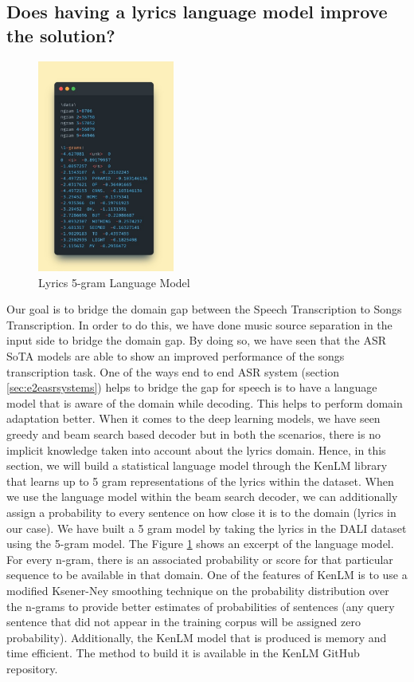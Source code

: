     
\subsection{Does having a lyrics language model improve the solution?}



\begin{figure}
    \centering
    \includegraphics[width=0.4\textwidth]{05-research study/figures/lyricslanguagemodel.pdf}
    \caption{Lyrics 5-gram Language Model}
    \label{fig:lyricslanguagemodel}
\end{figure}


Our goal is to bridge the domain gap between the Speech Transcription to Songs Transcription. In order to do this, we have done music source separation in the input side to bridge the domain gap. By doing so, we have seen that the ASR SoTA models are able to show an improved performance of the songs transcription task. One of the ways end to end ASR system (section \ref{sec:e2easrsystems}) helps to bridge the gap for speech is to have a language model that is aware of the domain while decoding. This helps to perform domain adaptation better. When it comes to the deep learning models, we have seen greedy and beam search based decoder but in both the scenarios, there is no implicit knowledge taken into account about the lyrics domain. Hence, in this section, we will build a statistical language model through the KenLM library \cite{heafield-etal-2013-scalable} that learns up to 5 gram representations of the lyrics within the dataset. When we use the language model within the beam search decoder, we can additionally assign a probability to every sentence on how close it is to the domain (lyrics in our case). We have built a 5 gram model by taking the lyrics in the DALI dataset using the 5-gram model. The Figure \ref{fig:lyricslanguagemodel} shows an excerpt of the language model. For every n-gram, there is an associated probability or score for that particular sequence to be available in that domain. One of the features of KenLM is to use a modified Ksener-Ney smoothing technique on the probability distribution over the n-grams to provide better estimates of probabilities of sentences (any query sentence that did not appear in the training corpus will be assigned zero probability). Additionally, the KenLM model that is produced is memory and time efficient. The method to build it is available in the KenLM GitHub repository.

